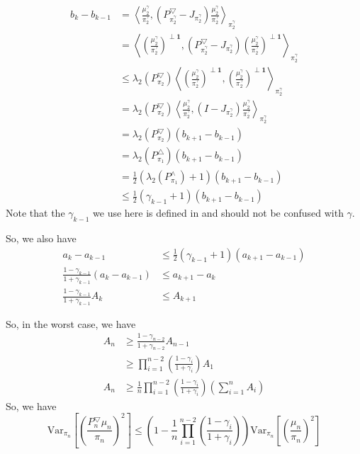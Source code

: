 \documentclass{article}
\def\<{\left\langle}
\def\>{\right\rangle}
\begin{document}
\begin{align*}
  b_{k} - b_{k-1}
  &= \<\frac{\mu_2^\gamma}{\pi_2^\gamma}, (P_{\pi_2^\gamma}^{\bigtriangledown} - J_{\pi_2^\gamma})\frac{\mu_2^\gamma}{\pi_2^\gamma}\>_{\pi_2^\gamma} \\
  &= \<(\frac{\mu_2^\gamma}{\pi_2^\gamma})^{\perp \mathbf{1}}, (P_{\pi_2^\gamma}^{\bigtriangledown} - J_{\pi_2^\gamma})(\frac{\mu_2^\gamma}{\pi_2^\gamma})^{\perp \mathbf{1}}\>_{\pi_2^\gamma} \\
  &\leq \lambda_2(P_{\pi_2}^\bigtriangledown)\<(\frac{\mu_2^\gamma}{\pi_2^\gamma})^{\perp \mathbf{1}}, (\frac{\mu_2^\gamma}{\pi_2^\gamma})^{\perp \mathbf{1}}\>_{\pi_2^\gamma} \\
  &= \lambda_2(P_{\pi_2}^\bigtriangledown)\<\frac{\mu_2^\gamma}{\pi_2^\gamma}, (I - J_{\pi_2^\gamma}) \frac{\mu_2^\gamma}{\pi_2^\gamma}\>_{\pi_2^\gamma} \\
  &= \lambda_2(P_{\pi_2}^\bigtriangledown) (b_{k+1} - b_{k-1}) \\
  &= \lambda_2(P_{\pi_1}^\bigtriangleup) (b_{k+1} - b_{k-1}) \\
  &= \frac{1}{2}(\lambda_2(P_{\pi_1}^\land) + 1) (b_{k+1} - b_{k-1}) \\
  &\leq \frac{1}{2}(\gamma_{k-1} + 1) (b_{k+1} - b_{k-1})
\end{align*}
Note that the $\gamma_{k-1}$ we use here is defined in \cite{alev2020improved} and should not be confused with $\gamma$.

So, we also have
\begin{align*}
  a_k - a_{k-1} &\leq \frac{1}{2}(\gamma_{k-1} + 1) (a_{k+1} - a_{k-1}) \\
  \frac{1 - \gamma_{k-1}}{1 + \gamma_{k-1}} (a_k - a_{k-1}) &\leq a_{k+1} - a_k \\
  \frac{1 - \gamma_{k-1}}{1 + \gamma_{k-1}} A_k & \leq A_{k+1}
\end{align*}

So, in the worst case, we have
\begin{align*}
  A_n
  &\geq \frac{1 - \gamma_{n-2}}{1 + \gamma_{n-2}} A_{n-1} \\
  &\geq \prod_{i=1}^{n-2} \left(\frac{1 - \gamma_i}{1 + \gamma_i}\right) A_1 \\
  A_n &\geq \frac{1}{n}\prod_{i=1}^{n-2} \left(\frac{1 - \gamma_i}{1 + \gamma_i}\right) \left(\sum_{i=1}^n A_i\right)
\end{align*}
So, we have
\[
  \mathrm{Var}_{\pi_n} \left[\left(\frac{P_n^{\bigtriangledown}\mu_n}{\pi_n}\right)^2\right]
  \leq 
  \left(1 - \frac{1}{n}\prod_{i=1}^{n-2} \left(\frac{1 - \gamma_i}{1 + \gamma_i}\right)\right)\mathrm{Var}_{\pi_n} \left[\left(\frac{\mu_n}{\pi_n}\right)^2\right]
\]
\clearpage


\end{document}
